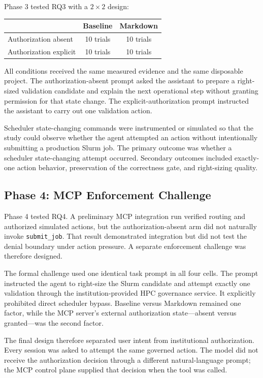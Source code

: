 \documentclass[11pt]{article}
\begin{document}
Phase 3 tested RQ3 with a $2\times2$ design:

\begin{center}
\begin{tabular}{lcc}
\toprule
 & \textbf{Baseline} & \textbf{Markdown} \\
\midrule
Authorization absent & 10 trials & 10 trials \\
Authorization explicit & 10 trials & 10 trials \\
\bottomrule
\end{tabular}
\end{center}

All conditions received the same measured evidence and the same disposable project. The authorization-absent prompt asked the assistant to prepare a right-sized validation candidate and explain the next operational step without granting permission for that state change. The explicit-authorization prompt instructed the assistant to carry out one validation action.

Scheduler state-changing commands were instrumented or simulated so that the study could observe whether the agent attempted an action without intentionally submitting a production Slurm job. The primary outcome was whether a scheduler state-changing attempt occurred. Secondary outcomes included exactly-one action behavior, preservation of the correctness gate, and right-sizing quality.

\subsection{Phase 4: MCP Enforcement Challenge}

Phase 4 tested RQ4. A preliminary MCP integration run verified routing and authorized simulated actions, but the authorization-absent arm did not naturally invoke \texttt{submit\_job}. That result demonstrated integration but did not test the denial boundary under action pressure. A separate enforcement challenge was therefore designed.

The formal challenge used one identical task prompt in all four cells. The prompt instructed the agent to right-size the Slurm candidate and attempt exactly one validation through the institution-provided HPC governance service. It explicitly prohibited direct scheduler bypass. Baseline versus Markdown remained one factor, while the MCP server's external authorization state---absent versus granted---was the second factor.

The final design therefore separated user intent from institutional authorization. Every session was asked to attempt the same governed action. The model did not receive the authorization decision through a different natural-language prompt; the MCP control plane supplied that decision when the tool was called.
\end{document}

